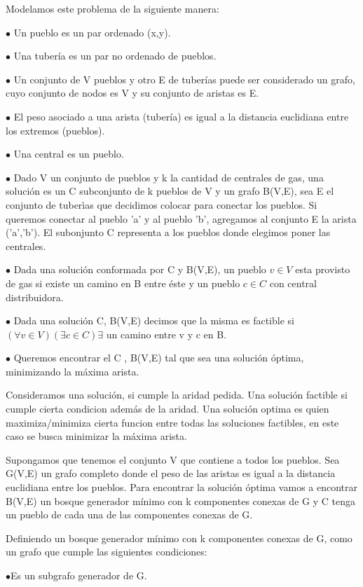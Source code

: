 Modelamos este problema de la siguiente manera:

$\bullet$ Un pueblo es un par ordenado (x,y).

$\bullet$ Una tubería es un par no ordenado de pueblos.

$\bullet$ Un conjunto de V pueblos y otro E de tuberías puede ser considerado un grafo, cuyo conjunto de nodos es V y su conjunto de aristas es E.

$\bullet$ El peso asociado a una arista (tubería) es igual a la distancia euclidiana entre los extremos (pueblos).

$\bullet$ Una central es un pueblo.

$\bullet$ Dado V un conjunto de pueblos y k la cantidad de centrales de gas, una solución es un C subconjunto de k pueblos de V y un grafo B(V,E), sea E el conjunto de tuberìas que decidimos colocar para conectar los pueblos. Si queremos conectar al pueblo 'a' y al pueblo 'b', agregamos al conjunto E la arista ('a','b'). El subonjunto C representa a los pueblos donde elegimos poner las centrales.  

$\bullet$ Dada una solución conformada por C y B(V,E), un pueblo $v \in V$ esta provisto de gas si existe un camino en B entre éste y un pueblo $c \in C$ con central distribuidora.

$\bullet$ Dada una solución C, B(V,E) decimos que la misma es factible si $(\forall v \in V)(\exists c \in C) \exists$ un camino entre v y c en B. 

$\bullet$ Queremos encontrar el C , B(V,E) tal que sea una solución óptima, minimizando la máxima arista.

Consideramos una solución, si cumple la aridad pedida. Una solución factible si cumple cierta condicion además de la aridad. Una solución optima es quien maximiza/minimiza cierta funcion entre todas las soluciones factibles, en este caso se busca minimizar la máxima arista.

Supongamos que tenemos el conjunto V que contiene a todos los pueblos. Sea G(V,E) un grafo completo donde el peso de las aristas es igual a la distancia euclidiana entre los pueblos. Para encontrar la solución óptima vamos a encontrar B(V,E) un bosque generador mínimo con k componentes conexas de G y C tenga un pueblo de cada una de las componentes conexas de G.

Definiendo un bosque generador mínimo con k componentes conexas de G, como un grafo que cumple las siguientes condiciones:

$\bullet$Es un subgrafo generador de G. 

